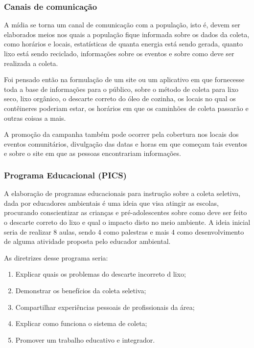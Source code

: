    \subsubsection{Canais de comunicação}

   A mídia se torna um canal de comunicação com a população, isto é, devem ser elaborados meios nos quais a população fique informada sobre os dados da coleta, como horários e locais, estatísticas de quanta energia está sendo gerada, quanto lixo está sendo reciclado, informações sobre os eventos e sobre como deve ser realizada a coleta.

   Foi pensado então na formulação de um site ou um aplicativo em que fornecesse toda a base de informações para o público, sobre o método de coleta para lixo seco, lixo orgânico, o descarte correto do óleo de cozinha, os locais no qual os contêineres poderiam estar, os horários em que os caminhões de coleta passarão e outras coisas a mais.

   A promoção da campanha também pode ocorrer pela cobertura nos locais dos eventos comunitários, divulgação das datas e horas em que começam tais eventos e sobre o site em que as pessoas encontrariam informações.

   \subsubsection{Programa Educacional (PICS)}

   A elaboração de programas educacionais para instrução sobre a coleta seletiva, dada por educadores ambientais é uma ideia que visa atingir as escolas, procurando conscientizar as crianças e pré-adolescentes sobre como deve ser feito o descarte correto do lixo e qual o impacto disto no meio ambiente. A ideia inicial seria de realizar 8 aulas, sendo 4 como palestras e mais 4 como desenvolvimento de alguma atividade proposta pelo educador ambiental.

   As diretrizes desse programa seria:

   \begin{enumerate}
     \item Explicar quais os problemas do descarte incorreto d lixo;
     \item Demonstrar os benefícios da coleta seletiva;
     \item Compartilhar experiências pessoais de profissionais da área;
     \item Explicar como funciona o sistema de coleta;
     \item Promover um trabalho educativo e integrador.
   \end{enumerate}

